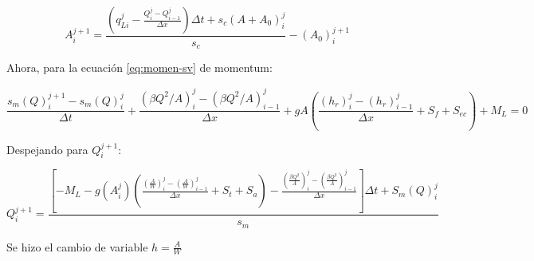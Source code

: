 \documentclass{article}
\begin{document}
\begin{tcolorbox}
\begin{equation}
  \label{eq:cont-sim}
  A_{i}^{j+1} = \frac{\left(q_{Li}^{j} - \frac{Q_{i}^{j} - Q_{i-1}^{j} }{\Delta x}  \right) \Delta t + s_{c} (A + A_{0})_{i}^{j}}{s_{c}} - (A_{0})_{i}^{j+1}
\end{equation}
  
\end{tcolorbox}


Ahora, para la ecuación \ref{eq:momen-sv} de momentum:

\[
\frac{s_{m} (Q)_{i}^{j+1} - s_{m}(Q)_{i}^{j} }{\Delta t} + \frac{(\beta Q^{2}/A)_{i}^{j} - (\beta Q^{2} /A)_{i-1}^{j} }{\Delta x} + gA \left( \frac{(h_{r})_{i}^{j} - (h_{r})_{i-1}^{j}}{\Delta x} + S_{f} + S_{ec}   \right) + M_{L} = 0
\]

Despejando para $Q_{i}^{j+1}$:

\begin{tcolorbox}
\begin{equation}
  \label{eq:momen-sim}
  Q_{i}^{j+1} = \frac{\left[ -M_{L} - g(A_{i}^{j}) \left(\frac{\left(\frac{A}{W}\right)_{i}^{j} - \left(\frac{A}{W}\right)_{i-1}^{j} }{\Delta x} + S_{t} + S_{a}  \right) - \frac{ \left( \frac{\beta Q^{2}}{A} \right)_{i}^{j} - \left( \frac{\beta Q^{2}}{A} \right)_{i-1}^{j}  }{\Delta x}           \right] \Delta t + S_{m} (Q)_{i}^{j}}{s_{m}}
\end{equation}

  
\end{tcolorbox}


Se hizo el cambio de variable $h = \frac{A}{W}$
\end{document}
